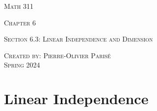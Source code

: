 \documentclass[20pt,a4paper]{extarticle}
\begin{document}
\thispagestyle{empty}

\begin{center}
\vspace*{0.75cm}

{\Huge \textsc{Math 311}}

\vspace*{1.5cm}

{\LARGE \textsc{Chapter 6}} 

\vspace*{0.75cm}

\noindent\textsc{Section 6.3: Linear Independence and Dimension}

\vspace*{0.25cm}

\tableofcontents

\vfill

\noindent \textsc{Created by: Pierre-Olivier Paris{\'e}} \\
\textsc{Spring 2024}
\end{center}

\newpage


\section{Linear Independence}
\end{document}
